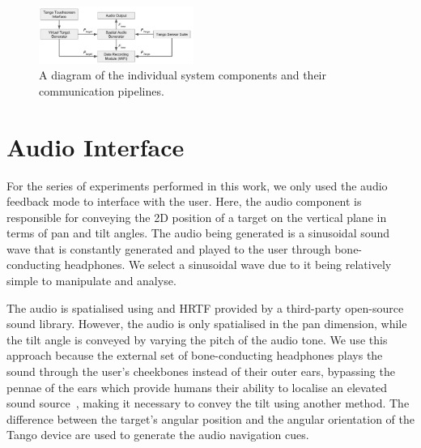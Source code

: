 \documentclass[format=sigconf, review=true, screen=true, anonymous=true]{acmart}
\begin{document}
\begin{figure}
  \centering
  \includegraphics[width=0.45\textwidth]{figures/pipeline.pdf}
  \caption{A diagram of the individual system components and their communication pipelines. }
  \label{fig:pipeline}
\end{figure}

\section{Audio Interface}
\label{sec:interface}

For the series of experiments performed in this work, we only used the audio feedback mode to interface with the user. Here, the audio component is responsible for conveying the 2D position of a target on the vertical plane in terms of pan and tilt angles. 
The audio being generated is a sinusoidal sound wave that is constantly generated and played to the user through bone-conducting headphones. We select a sinusoidal wave due to it being relatively simple to manipulate and analyse. %

The audio is spatialised using and HRTF provided by a third-party open-source sound library. However, the audio is only spatialised in the pan dimension, while the tilt angle is conveyed by varying the pitch of the audio tone. We use this approach because the external set of bone-conducting headphones plays the sound through the user's cheekbones instead of their outer ears, bypassing the pennae of the ears which provide humans their ability to localise an elevated sound source~\cite{roffler1968factors, algazi2001elevation}, making it necessary to convey the tilt using another method. The difference between the target's angular position and the angular orientation of the Tango device are used to generate the audio navigation cues. %
\end{document}
